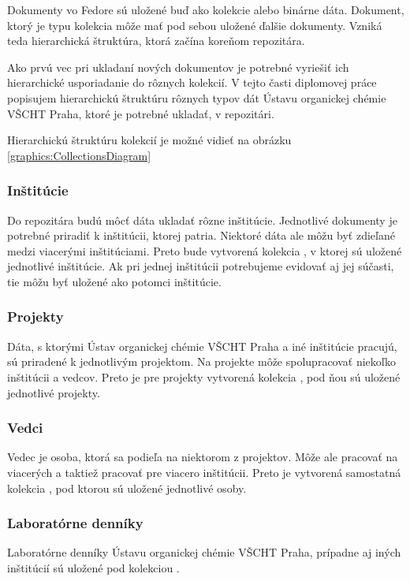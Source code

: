 \documentclass[thesis=M,slovak]{FITthesis}[2013/05/06]
\begin{document}
Dokumenty vo Fedore sú uložené buď ako kolekcie alebo binárne dáta. Dokument, ktorý je typu kolekcia môže mať pod sebou uložené ďalšie dokumenty. Vzniká teda hierarchická štruktúra, ktorá začína koreňom repozitára.

Ako prvú vec pri ukladaní nových dokumentov je potrebné vyriešiť ich hierarchické usporiadanie do rôznych kolekcií. V tejto časti diplomovej práce popisujem hierarchickú štruktúru rôznych typov dát Ústavu organickej chémie VŠCHT Praha, ktoré je potrebné ukladať, v repozitári.

Hierarchickú štruktúru kolekcií je možné vidieť na obrázku \ref{graphics:CollectionsDiagram}

\subsubsection{Inštitúcie}
Do repozitára budú môcť dáta ukladať rôzne inštitúcie. Jednotlivé dokumenty je potrebné priradiť k inštitúcii, ktorej patria. Niektoré dáta ale môžu byť zdieľané medzi viacerými inštitúciami. Preto bude vytvorená kolekcia , v ktorej sú uložené jednotlivé inštitúcie. Ak pri jednej inštitúcii potrebujeme evidovať aj jej súčasti, tie môžu byť uložené ako potomci inštitúcie.

\subsubsection{Projekty}
Dáta, s ktorými Ústav organickej chémie VŠCHT Praha a iné inštitúcie pracujú, sú priradené k jednotlivým projektom. Na projekte môže spolupracovať niekoľko inštitúcii a vedcov. Preto je pre projekty vytvorená kolekcia , pod ňou sú uložené jednotlivé projekty.

\subsubsection{Vedci}
Vedec je osoba, ktorá sa podieľa na niektorom z projektov. Môže ale pracovať na viacerých a taktiež pracovať pre viacero inštitúcii. Preto je vytvorená samostatná kolekcia , pod ktorou sú uložené jednotlivé osoby.

\subsubsection{Laboratórne denníky}
Laboratórne denníky Ústavu organickej chémie VŠCHT Praha, prípadne aj iných inštitúcií sú uložené pod kolekciou .
\end{document}
